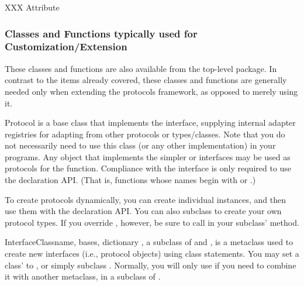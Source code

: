 \begin{verbatim%
}
\begin{verbatim%
}
\begin{verbatim%
}
\begin{verbatim%
}
\begin{verbatim%
}
\begin{verbatim%
}
XXX Attribute






















\subsubsection{Classes and Functions typically used for Customization/Extension}

These classes and functions are also available from the top-level
 package.  In contrast to the items already covered, these
classes and functions are generally needed only when extending the protocols
framework, as opposed to merely using it.

\begin{classdesc*}{Protocol}
 is a base class that implements the 
interface, supplying internal adapter registries for adapting from other
protocols or types/classes.  Note that you do not necessarily need to use this
class (or any other  implementation) in
your programs.  Any object that implements the simpler  or
 interfaces may be used as protocols for the
 function.  Compliance with the 
interface is only required to use the  declaration API.
(That is, functions whose names begin with  or .)

To create protocols dynamically, you can create individual 
instances, and then use them with the declaration API.  You can also subclass
 to create your own protocol types.  If you override
, however, be sure to call 
in your subclass'  method.
\end{classdesc*}


\begin{classdesc}{InterfaceClass}{name, bases, dictionary}
, a subclass of  and , is a
metaclass used to create new interfaces (i.e., protocol objects) using class
statements.  You may set a class'  to
, or simply subclass .  Normally, you
will only use  if you need to combine it with another
metaclass, in a subclass of .
\end{classdesc}








\end{verbatim%
}
\end{verbatim%
}
\end{verbatim%
}
\end{verbatim%
}
\end{verbatim%
}
\end{verbatim%
}
